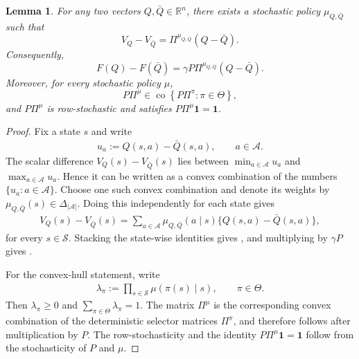 \documentclass[letterpaper]{article}
\numberwithin{equation}{section}
\newtheorem{lemma}{Lemma}[section]
\newcommand{\R}{\mathbb{R}}
\newcommand{\co}{\operatorname{co}}
\begin{document}
\begin{lemma}
\label{lem:bellman_difference_selector}
For any two vectors $Q,\bar Q\in\R^{n}$, there exists a stochastic policy
$\mu_{Q,\bar Q}$ such that
\begin{equation}
  V_Q-V_{\bar Q}=\Pi^{\mu_{Q,\bar Q}}(Q-\bar Q).
  \label{eq:value-difference-selector-general}
\end{equation}
Consequently,
\begin{equation}
  F(Q)-F(\bar Q)=\gamma P\Pi^{\mu_{Q,\bar Q}}(Q-\bar Q).
  \label{eq:bellman-difference-selector-general}
\end{equation}
Moreover, for every stochastic policy $\mu$,
\begin{equation}
  P\Pi^\mu\in\co\left\{P\Pi^\pi:\pi\in\Theta\right\},
  \label{eq:policy-convex-hull}
\end{equation}
and $P\Pi^\mu$ is row-stochastic and satisfies $P\Pi^\mu\mathbf{1}=\mathbf{1}$.
\end{lemma}
\begin{proof}
Fix a state $s$ and write
\begin{align*}
  u_a:=Q(s,a)-\bar Q(s,a),
  \qquad a\in\mathcal A.
\end{align*}
The scalar difference $V_Q(s)-V_{\bar Q}(s)$ lies between
$\min_{a\in\mathcal A}u_a$ and $\max_{a\in\mathcal A}u_a$. Hence it can be
written as a convex combination of the numbers $\{u_a:a\in\mathcal A\}$. Choose
one such convex combination and denote its weights by
$\mu_{Q,\bar Q}(s)\in\Delta_{|\mathcal A|}$. Doing this independently for each
state gives
\begin{align*}
  V_Q(s)-V_{\bar Q}(s)
  =\sum_{a\in\mathcal A}\mu_{Q,\bar Q}(a\mid s)
  \{Q(s,a)-\bar Q(s,a)\},
\end{align*}
for every $s\in\mathcal S$. Stacking the state-wise identities gives
, and multiplying by $\gamma P$ gives
.

For the convex-hull statement, write
\begin{align*}
  \lambda_\pi:=\prod_{s\in\mathcal S}\mu(\pi(s)\mid s),
  \qquad \pi\in\Theta.
\end{align*}
Then $\lambda_\pi\ge0$ and $\sum_{\pi\in\Theta}\lambda_\pi=1$. The matrix
$\Pi^\mu$ is the corresponding convex combination of the deterministic selector
matrices $\Pi^\pi$, and therefore  follows after
multiplication by $P$. The row-stochasticity and the identity
$P\Pi^\mu\mathbf{1}=\mathbf{1}$ follow from the stochasticity of $P$ and
$\mu$.
\end{proof}
\end{document}
